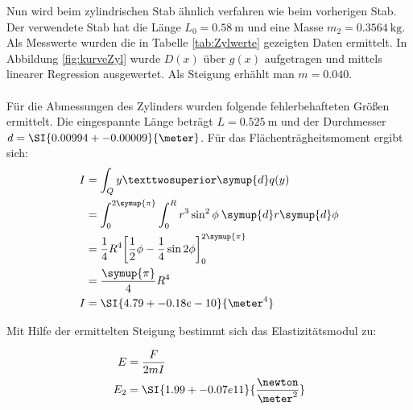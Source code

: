 Nun wird beim zylindrischen Stab ähnlich verfahren wie beim vorherigen Stab. Der verwendete Stab hat die Länge $L_0=\SI{0.58}{\meter}$ und eine Masse $m_2=\SI{0.3564}{\kilo\gram}$.
Als Messwerte wurden die in Tabelle \ref{tab:Zylwerte} gezeigten Daten ermittelt.
In Abbildung \ref{fig:kurveZyl} wurde $D(x)$ über $g(x)$ aufgetragen und mittels linearer Regression ausgewertet. Als Steigung erhählt man $m=\num{0.040}$.
\\
\\
Für die Abmessungen des Zylinders wurden folgende fehlerbehafteten Größen ermittelt.
Die eingespannte Länge beträgt $L=\SI{0.525}{\meter}$ und der Durchmesser $d=\SI{0.00994+-0.00009}{\meter}$.
Für das Flächenträgheitsmoment ergibt sich:
\begin{align*}
    I &= \int_Q y² \symup{d}q(y) \\
      &= \int_0^{2\symup{\pi}} \int_0^R r^3\sin^2\phi \: \symup{d}r\symup{d}\phi \\
      &= \frac{1}{4}R^4 \biggl[\frac{1}{2}\phi-\frac{1}{4}\sin2\phi\biggr]_0^{2\symup{\pi}} \\
      &= \frac{\symup{\pi}}{4}R^4 \\
    I &= \SI{4.79+-0.18e-10}{\meter^4} \\
\end{align*}

Mit Hilfe der ermittelten Steigung bestimmt sich das Elastizitätsmodul zu:

\begin{align*}
    E   &= \frac{F}{2mI} \\
    E_2 &= \SI{1.99+-0.07e11}{\frac{\newton}{\meter^2}} \\
\end{align*}

